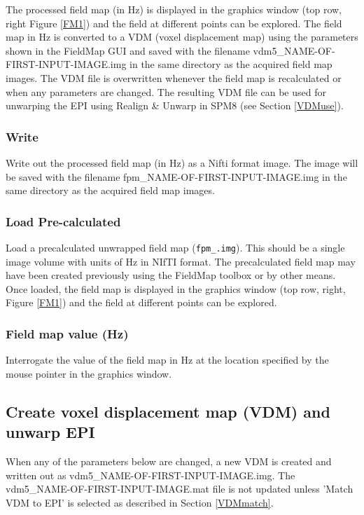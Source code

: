 The processed field map (in Hz) is displayed in the graphics window (top row, right Figure \ref{FM1}) and the field at different points can be explored. The field map in Hz is converted to a VDM (voxel displacement map) using the parameters shown in the FieldMap GUI and saved with the filename vdm5\_NAME-OF-FIRST-INPUT-IMAGE.img in the same directory as the acquired field map images. The VDM file is overwritten whenever the field map is recalculated or when any parameters are changed. The resulting VDM file can be used for unwarping the EPI using Realign \& Unwarp in SPM8 (see Section \ref{VDMuse}).

\subsubsection{Write}
Write out the processed field map (in Hz) as a Nifti format image. The image will be saved with the filename fpm\_NAME-OF-FIRST-INPUT-IMAGE.img in the same directory as the acquired field map images.

\subsubsection{Load Pre-calculated}
Load a precalculated unwrapped field map (\texttt{fpm\_\*.img}). This should be a single image volume with units of Hz in NIfTI format. The precalculated field map may have been created previously using the FieldMap toolbox or by other means. Once loaded, the field map is displayed in the graphics window (top row, right, Figure \ref{FM1}) and the field at different points can be explored.

\subsubsection{Field map value (Hz)}
Interrogate the value of the field map in Hz at the location specified by the mouse pointer in the graphics window.

\subsection{Create voxel displacement map (VDM) and unwarp EPI}

When any of the parameters below are changed, a new VDM is created and written out as vdm5\_NAME-OF-FIRST-INPUT-IMAGE.img. The vdm5\_NAME-OF-FIRST-INPUT-IMAGE.mat file is not updated unless 'Match VDM to EPI' is selected as described in Section \ref{VDMmatch}.


